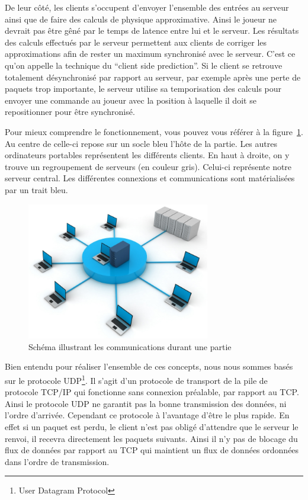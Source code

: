 \documentclass[11pt]{report}
\begin{document}
De leur côté, les clients s'occupent d'envoyer l'ensemble des entrées au serveur ainsi que de faire des calculs de physique approximative. Ainsi le joueur ne devrait pas être gêné par le temps de latence entre lui et le serveur. Les résultats des calculs effectués par le serveur permettent aux clients de corriger les approximations afin de rester un maximum synchronisé avec le serveur. C'est ce qu'on appelle la technique du ``client side prediction''. Si le client se retrouve totalement désynchronisé par rapport au serveur, par exemple après une perte de paquets trop importante, le serveur utilise sa temporisation des calculs pour envoyer une commande au joueur avec la position à laquelle il doit se repositionner pour être synchronisé.

Pour mieux comprendre le fonctionnement, vous pouvez vous référer à la figure~\ref{reseau}. Au centre de celle-ci repose sur un socle bleu l'hôte de la partie. Les autres ordinateurs portables représentent les différents clients. En haut à droite, on y trouve un regroupement de serveurs (en couleur gris). Celui-ci représente notre serveur central. Les différentes connexions et communications sont matérialisées par un trait bleu.

\begin{figure}[htbp]
\centering
\includegraphics[width=8cm]{reseau.jpg}
\caption{Schéma illustrant les communications durant une partie}
\label{reseau}
\end{figure}

Bien entendu pour réaliser l'ensemble de ces concepts, nous nous sommes basés sur le protocole UDP\footnote{User Datagram Protocol}. Il s'agit d'un protocole de transport de la pile de protocole TCP/IP qui fonctionne sans connexion préalable, par rapport au TCP. Ainsi le protocole UDP ne garantit pas la bonne transmission des données, ni l'ordre d'arrivée. Cependant ce protocole à l'avantage d'être le plus rapide. En effet si un paquet est perdu, le client n'est pas obligé d'attendre que le serveur le renvoi, il recevra directement les paquets suivants. Ainsi il n'y pas de blocage du flux de données par rapport au TCP qui maintient un flux de données ordonnées dans l'ordre de transmission.
\end{document}

